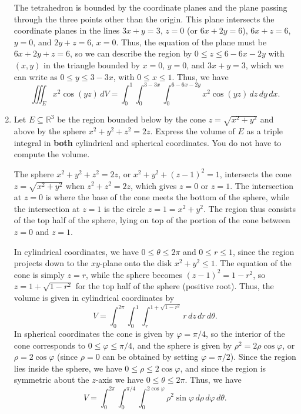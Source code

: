 \documentclass[12pt]{article}
\newcommand{\points}[1]{\marginpar{\hspace{24pt}[#1]}}
\newcommand{\R}{\mathbb{R}}
\begin{document}
\begin{enumerate}
\bigskip

The tetrahedron is bounded by the coordinate planes and the plane passing through the three points other than the origin. This plane intersects the coordinate planes in the lines $3x+y=3$, $z=0$ (or $6x+2y=6$), $6x+z=6$, $y=0$, and $2y+z=6$, $x=0$. Thus, the equation of the plane must be $6x+2y+z=6$, so we can describe the region by $0\leq z\leq 6-6x-2y$ with $(x,y)$ in the triangle bounded by $x=0$, $y=0$, and $3x+y=3$, which we can write as $0\leq y\leq 3-3x$, with $0\leq x\leq 1$. Thus, we have
\[
 \iiint_E x^2\cos(yz)\,dV = \int_0^1\int_{0}^{3-3x}\int_0^{6-6x-2y}x^2\cos(yz)\,dz\,dy\,dx.
\]

\bigskip

\bigskip

\item Let $E\subseteq \R^3$ be the region bounded below by the cone $z=\sqrt{x^2+y^2}$ and above by the sphere $x^2+y^2+z^2=2z$. Express the volume of $E$ as a triple integral in {\bf both} cylindrical and spherical coordinates. You do not have to compute the volume. \points{6}

\bigskip

The sphere $x^2+y^2+z^2=2z$, or $x^2+y^2+(z-1)^2=1$, intersects the cone $z=\sqrt{x^2+y^2}$ when $z^2+z^2=2z$, which gives $z=0$ or $z=1$. The intersection at $z=0$ is where the base of the cone meets the bottom of the sphere, while the intersection at $z=1$ is the circle $z=1=x^2+y^2$. The region thus consists of the top half of the sphere, lying on top of the portion of the cone between $z=0$ and $z=1$.

In cylindrical coordinates, we have $0\leq \theta\leq 2\pi$ and $0\leq r\leq 1$, since the region projects down to the $xy$-plane onto the disk $x^2+y^2\leq 1$. The equation of the cone is simply $z=r$, while the sphere becomes $(z-1)^2 = 1-r^2$, so $z=1+\sqrt{1-r^2}$ for the top half of the sphere (positive root). Thus, the volume is given in cylindrical coordinates by
\[
 V = \int_0^{2\pi}\int_0^1\int_r^{1+\sqrt{1-r^2}}r\,dz\,dr\,d\theta.
\]
In spherical coordinates the cone is given by $\varphi = \pi/4$, so the interior of the cone corresponds to $0\leq\varphi\leq \pi/4$, and the sphere is given by $\rho^2=2\rho\cos\varphi$, or $\rho=2\cos\varphi$ (since $\rho=0$ can be obtained by setting $\varphi = \pi/2$). Since the region lies inside the sphere, we have $0\leq \rho\leq 2\cos\varphi$, and since the region is symmetric about the $z$-axis we have $0\leq \theta\leq 2\pi$. Thus, we have
\[
 V = \int_0^{2\pi}\int_0^{\pi/4}\int_0^{2\cos\varphi}\rho^2\sin\varphi\,d\rho\,d\varphi\,d\theta.
\]
\end{enumerate}
\end{document}
